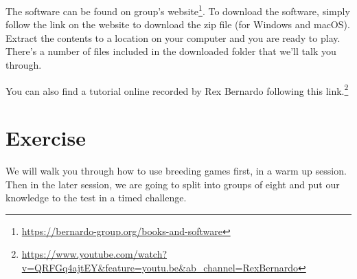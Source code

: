 \documentclass[
]{book}
\renewcommand{\href}[2]{#2\footnote{\url{#1}}}
\begin{document}
The software can be found on group's \href{https://bernardo-group.org/books-and-software}{website}. To download the software, simply follow the link on the website to download the zip file (for Windows and macOS). Extract the contents to a location on your computer and you are ready to play. There's a number of files included in the downloaded folder that we'll talk you through.

You can also find a tutorial online recorded by Rex Bernardo following this \href{https://www.youtube.com/watch?v=QRFGq4ajtEY\&feature=youtu.be\&ab_channel=RexBernardo}{link.}

\hypertarget{exercise}{%
\section{Exercise}\label{exercise}}

We will walk you through how to use breeding games first, in a warm up session. Then in the later session, we are going to split into groups of eight and put our knowledge to the test in a timed challenge.

\backmatter

  

\printindex
\end{document}
